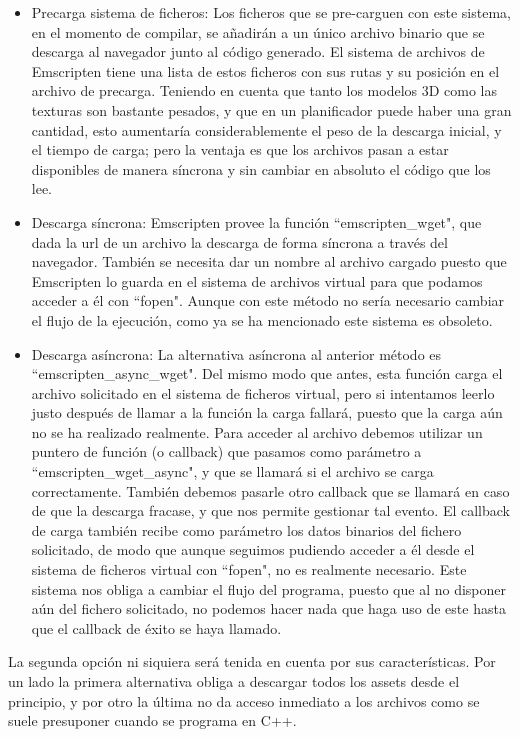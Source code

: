 \begin{itemize}
    \item Precarga sistema de ficheros: Los ficheros que se pre-carguen con este sistema, en el momento de compilar, se añadirán a un único archivo binario que se descarga al navegador junto al código generado. El sistema de archivos de Emscripten tiene una lista de estos ficheros con sus rutas y su posición en el archivo de precarga. Teniendo en cuenta que tanto los modelos 3D como las texturas son bastante pesados, y que en un planificador puede haber una gran cantidad, esto aumentaría considerablemente el peso de la descarga inicial, y el tiempo de carga; pero la ventaja es que los archivos pasan a estar disponibles de manera síncrona y sin cambiar en absoluto el código que los lee.
    \item Descarga síncrona: Emscripten provee la función ``emscripten\_wget", que dada la url de un archivo la descarga de forma síncrona a través del navegador. También se necesita dar un nombre al archivo cargado puesto que Emscripten lo guarda en el sistema de archivos virtual para que podamos acceder a él con ``fopen". Aunque con este método no sería necesario cambiar el flujo de la ejecución, como ya se ha mencionado este sistema es obsoleto.
    \item Descarga asíncrona: La alternativa asíncrona al anterior método es ``emscripten\_async\_wget". Del mismo modo que antes, esta función carga el archivo solicitado en el sistema de ficheros virtual, pero si intentamos leerlo justo después de llamar a la función la carga fallará, puesto que la carga aún no se ha realizado realmente. Para acceder al archivo debemos utilizar un puntero de función (o callback) que pasamos como parámetro a ``emscripten\_wget\_async", y que se llamará si el archivo se carga correctamente. También debemos pasarle otro callback que se llamará en caso de que la descarga fracase, y que nos permite gestionar tal evento. El callback de carga también recibe como parámetro los datos binarios del fichero solicitado, de modo que aunque seguimos pudiendo acceder a él desde el sistema de ficheros virtual con ``fopen", no es realmente necesario. Este sistema nos obliga a cambiar el flujo del programa, puesto que al no disponer aún del fichero solicitado, no podemos hacer nada que haga uso de este hasta que el callback de éxito se haya llamado.
\end{itemize}

La segunda opción ni siquiera será tenida en cuenta por sus características. Por un lado la primera alternativa obliga a descargar todos los assets desde el principio, y por otro la última no da acceso inmediato a los archivos como se suele presuponer cuando se programa en C++.

